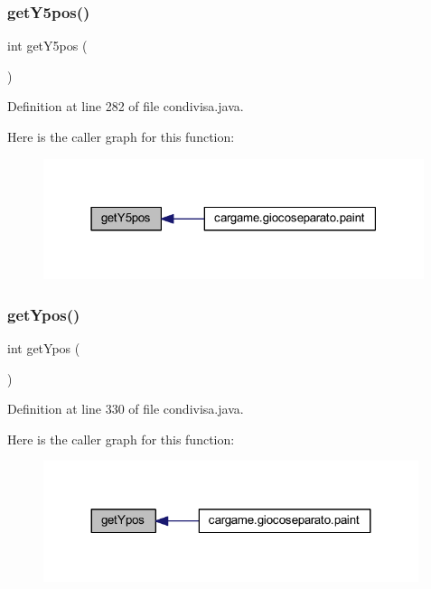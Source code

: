 \subsubsection{\texorpdfstring{get\+Y5pos()}{getY5pos()}}
{\footnotesize\ttfamily int get\+Y5pos (\begin{DoxyParamCaption}{ }\end{DoxyParamCaption})}



Definition at line 282 of file condivisa.\+java.

Here is the caller graph for this function\+:
\nopagebreak
\begin{figure}[H]
\begin{center}
\leavevmode
\includegraphics[width=316pt]{classcargame_1_1condivisa_aeb24cee3959c82e3fa622c2ceaf59cc9_icgraph}
\end{center}
\end{figure}
\mbox{\label{classcargame_1_1condivisa_a07f761ace0143e14220c2905ceb2cb37}} 
\subsubsection{\texorpdfstring{get\+Ypos()}{getYpos()}}
{\footnotesize\ttfamily int get\+Ypos (\begin{DoxyParamCaption}{ }\end{DoxyParamCaption})}



Definition at line 330 of file condivisa.\+java.

Here is the caller graph for this function\+:
\nopagebreak
\begin{figure}[H]
\begin{center}
\leavevmode
\includegraphics[width=311pt]{classcargame_1_1condivisa_a07f761ace0143e14220c2905ceb2cb37_icgraph}
\end{center}
\end{figure}
\mbox{\label{classcargame_1_1condivisa_a0db1c898200d64b881a2657712f72e40}} 
